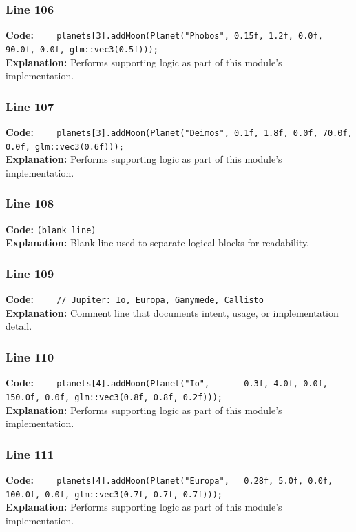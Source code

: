 \documentclass[11pt,a4paper]{article}
\begin{document}
\subsubsection*{Line 106}
\textbf{Code:} \verb|    planets[3].addMoon(Planet("Phobos", 0.15f, 1.2f, 0.0f, 90.0f, 0.0f, glm::vec3(0.5f)));|\\
\textbf{Explanation:} Performs supporting logic as part of this module's implementation.

\subsubsection*{Line 107}
\textbf{Code:} \verb|    planets[3].addMoon(Planet("Deimos", 0.1f, 1.8f, 0.0f, 70.0f, 0.0f, glm::vec3(0.6f)));|\\
\textbf{Explanation:} Performs supporting logic as part of this module's implementation.

\subsubsection*{Line 108}
\textbf{Code:} \texttt{(blank line)}\\
\textbf{Explanation:} Blank line used to separate logical blocks for readability.

\subsubsection*{Line 109}
\textbf{Code:} \verb|    // Jupiter: Io, Europa, Ganymede, Callisto|\\
\textbf{Explanation:} Comment line that documents intent, usage, or implementation detail.

\subsubsection*{Line 110}
\textbf{Code:} \verb|    planets[4].addMoon(Planet("Io",       0.3f, 4.0f, 0.0f, 150.0f, 0.0f, glm::vec3(0.8f, 0.8f, 0.2f)));|\\
\textbf{Explanation:} Performs supporting logic as part of this module's implementation.

\subsubsection*{Line 111}
\textbf{Code:} \verb|    planets[4].addMoon(Planet("Europa",   0.28f, 5.0f, 0.0f, 100.0f, 0.0f, glm::vec3(0.7f, 0.7f, 0.7f)));|\\
\textbf{Explanation:} Performs supporting logic as part of this module's implementation.
\end{document}
